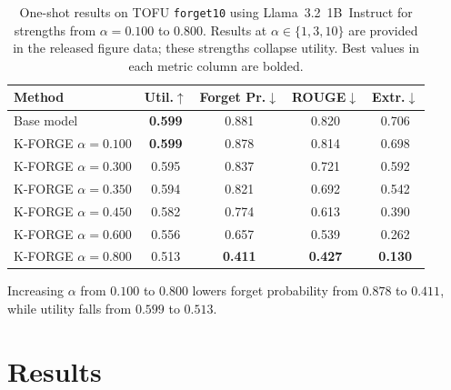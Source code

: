 \documentclass[11pt]{article}
\begin{document}
\begin{table}[htbp!]
\centering
\footnotesize
\setlength{\tabcolsep}{1pt}
\begin{tabular}{lcccc}
\toprule
\textbf{Method} & \textbf{Util.}$\uparrow$ & \textbf{Forget Pr.}$\downarrow$ & \textbf{ROUGE}$\downarrow$ & \textbf{Extr.}$\downarrow$ \\
\midrule
Base model & \textbf{0.599} & 0.881 & 0.820 & 0.706 \\
K-FORGE $\alpha\!=\!0.100$ & \textbf{0.599} & 0.878 & 0.814 & 0.698 \\
K-FORGE $\alpha\!=\!0.300$ & 0.595 & 0.837 & 0.721 & 0.592 \\
K-FORGE $\alpha\!=\!0.350$ & 0.594 & 0.821 & 0.692 & 0.542 \\
K-FORGE $\alpha\!=\!0.450$ & 0.582 & 0.774 & 0.613 & 0.390 \\
K-FORGE $\alpha\!=0.600$ & 0.556 & 0.657 & 0.539 & 0.262 \\
K-FORGE $\alpha\!=\!0.800$ & 0.513 & \textbf{0.411} & \textbf{0.427} & \textbf{0.130} \\
\bottomrule
\end{tabular}
\caption{One-shot results on TOFU \texttt{forget10} using Llama~3.2~1B~Instruct for strengths from $\alpha=0.100$ to $0.800$.
Results at $\alpha\in\{1,3,10\}$ are provided in the released figure data; these strengths collapse utility. Best values in each metric column are bolded.}
\label{tab:oneshot_forget10}
\end{table}

Increasing $\alpha$ from $0.100$ to $0.800$ lowers forget probability from $0.878$ to $0.411$, while utility falls from $0.599$ to $0.513$.

\section{Results}
\label{sec:results}
\end{document}
